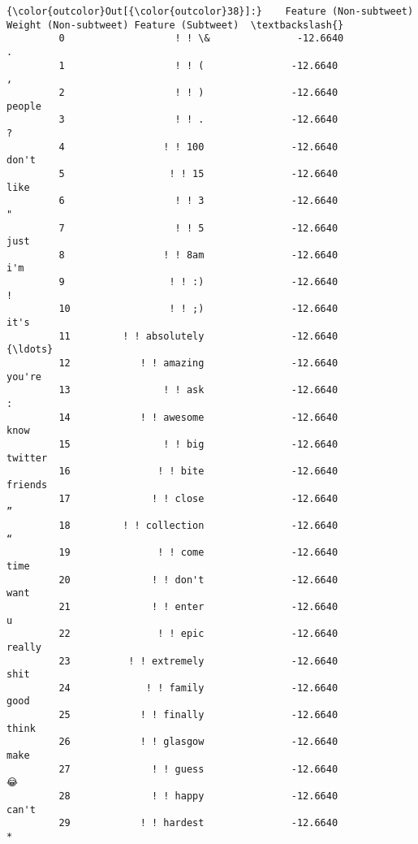 \documentclass[11pt]{article}
\begin{document}
\begin{Verbatim}[commandchars=\\\{\}]
{\color{outcolor}Out[{\color{outcolor}38}]:}    Feature (Non-subtweet)  Weight (Non-subtweet) Feature (Subtweet)  \textbackslash{}
         0                   ! ! \&               -12.6640                  .   
         1                   ! ! (               -12.6640                  ,   
         2                   ! ! )               -12.6640             people   
         3                   ! ! .               -12.6640                  ?   
         4                 ! ! 100               -12.6640              don't   
         5                  ! ! 15               -12.6640               like   
         6                   ! ! 3               -12.6640                  "   
         7                   ! ! 5               -12.6640               just   
         8                 ! ! 8am               -12.6640                i'm   
         9                  ! ! :)               -12.6640                  !   
         10                 ! ! ;)               -12.6640               it's   
         11         ! ! absolutely               -12.6640                {\ldots}   
         12            ! ! amazing               -12.6640             you're   
         13                ! ! ask               -12.6640                  :   
         14            ! ! awesome               -12.6640               know   
         15                ! ! big               -12.6640            twitter   
         16               ! ! bite               -12.6640            friends   
         17              ! ! close               -12.6640                  ”   
         18         ! ! collection               -12.6640                  “   
         19               ! ! come               -12.6640               time   
         20              ! ! don't               -12.6640               want   
         21              ! ! enter               -12.6640                  u   
         22               ! ! epic               -12.6640             really   
         23          ! ! extremely               -12.6640               shit   
         24             ! ! family               -12.6640               good   
         25            ! ! finally               -12.6640              think   
         26            ! ! glasgow               -12.6640               make   
         27              ! ! guess               -12.6640                  😂   
         28              ! ! happy               -12.6640              can't   
         29            ! ! hardest               -12.6640                  *   

\end{Verbatim}
\end{document}
